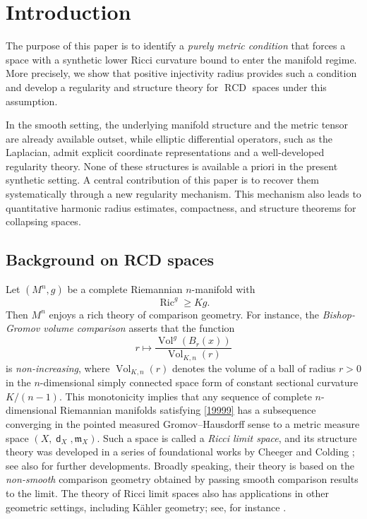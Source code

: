 \documentclass[11pt,reqno]{amsart}
\theoremstyle{definition}
\numberwithin{equation}{section}
\newcommand{\meas}{\mathfrak{m}}
\DeclareMathOperator{\dist}{\mathsf{d}}
\DeclareMathOperator{\RCD}{RCD}
\DeclareMathOperator{\Ric}{Ric}
\DeclareMathOperator{\Vol}{Vol}
\begin{document}
\tableofcontents


\section{Introduction}



The purpose of this paper is to identify a {\it purely metric condition} that forces a space with a synthetic lower Ricci curvature bound to enter the manifold regime.
More precisely, we show that positive injectivity radius provides such a condition and develop a regularity and structure theory for $\RCD$ spaces under this assumption.

In the smooth setting, the underlying manifold structure and the  metric tensor are already available outset, while elliptic differential operators, such as the Laplacian, admit explicit coordinate representations and a well-developed regularity theory. None of these structures is available a priori in the present synthetic setting. A central contribution of this paper is to recover them systematically through a new regularity mechanism. This mechanism also leads to quantitative harmonic radius estimates, compactness, and structure  theorems for collapsing spaces.

  


\subsection{Background on RCD spaces}
Let $(M^n, g)$ be a complete Riemannian $n$-manifold with
\begin{equation}\label{19999}
    \Ric^g\ge K  g.
\end{equation}
Then $M^n$ enjoys a rich theory of comparison geometry. For instance, the \textit{Bishop-Gromov  volume comparison} asserts that the function
\begin{equation}
   r \mapsto \frac{\Vol^g (B_r(x))}{\Vol_{K,n}(r)}
\end{equation}
is {\it non-increasing},
where $\Vol_{K,n}(r)$ denotes the volume of a ball of radius $r>0$ in the $n$-dimensional simply connected space form of constant sectional curvature $K/(n-1)$. This monotonicity implies that any sequence of complete $n$-dimensional Riemannian manifolds satisfying \eqref{19999} has a subsequence converging in the pointed measured Gromov–Hausdorff sense to  a metric measure space $(X, \dist_X, \meas_X)$. Such a space is called a \textit{Ricci limit space}, and its structure theory was developed in a series of foundational works by Cheeger and Colding  \cite{CheegerColding1, CheegerColding2, Cheeger-Colding-III}; see also \cite{ColdingN, CJN} for further developments. Broadly speaking, their theory is based on the {\it  non-smooth} comparison geometry obtained by passing smooth comparison results to the limit.
The theory of Ricci limit spaces also has applications in other geometric settings, including K\"ahler geometry; see, for instance \cite{DonS,SZ}.
\end{document}
